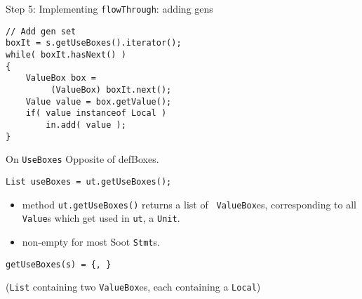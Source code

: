 \begin{slide}{Step 5: Implementing {\tt flowThrough}: adding gens}
\begin{verbatim}
// Add gen set
boxIt = s.getUseBoxes().iterator();
while( boxIt.hasNext() ) 
{
    ValueBox box = 
         (ValueBox) boxIt.next();
    Value value = box.getValue();
    if( value instanceof Local )
        in.add( value );
}
\end{verbatim}
\end{slide}

\begin{slide}{On {\tt UseBoxes}}
\vspace*{-0.1in}
Opposite of defBoxes.

{\tt List useBoxes = ut.getUseBoxes();}

\vspace*{-0.05in}
\begin{itemize}
\item method {\red \tt ut.getUseBoxes()} returns a list of {\tt
ValueBox}es, corresponding to all {\tt Value}s which get used
in {\tt ut}, a {\tt Unit}. 

\item non-empty for most Soot {\tt Stmt}s.
\end{itemize}

\vspace*{-0.08in}
\begin{center}
\end{center}

\vspace*{0.05in}
{\tt getUseBoxes(s) = \{, \}}\\
\qquad \qquad \begin{minipage}{0.8\textwidth} 
({\tt List} containing two {\tt ValueBox}es, each containing a {\tt Local})
\end{minipage}

\end{slide}

